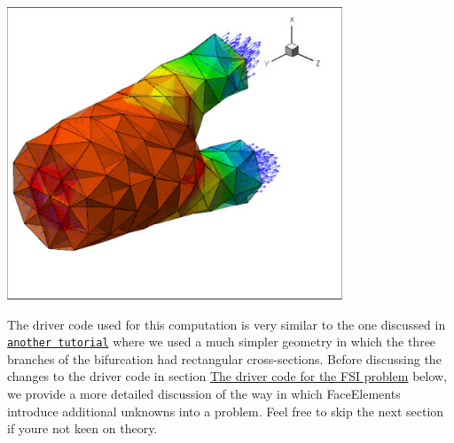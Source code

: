  
\begin{DoxyImage}
\includegraphics[width=0.75\textwidth]{elastic_iliac_fluid}
\end{DoxyImage}


The driver code used for this computation is very similar to the one discussed in \href{../../unstructured_three_d_fsi/html/index.html}{\tt another tutorial} where we used a much simpler geometry in which the three branches of the bifurcation had rectangular cross-\/sections. Before discussing the changes to the driver code in section \hyperlink{index_driver_code}{The driver code for the F\+SI problem} below, we provide a more detailed discussion of the way in which {\ttfamily Face\+Elements} introduce additional unknowns into a problem. Feel free to skip the next section if you\textquotesingle{}re not keen on theory.



 

